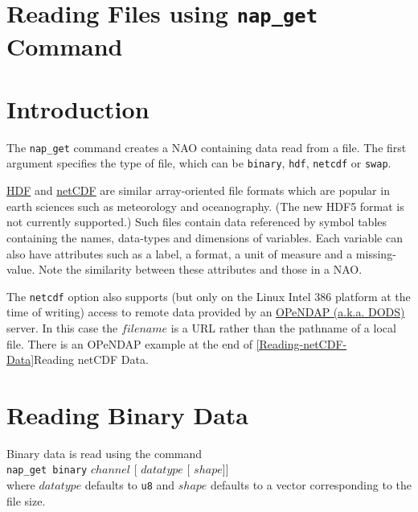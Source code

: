     \section{Reading Files using 
    \texttt{nap\_get} Command}

  \section{
    \label{Introduction}Introduction
  }

  

The 
  \texttt{nap\_get} command creates a NAO containing data read from
  a file. The first argument specifies the type of file, which can be 
  \texttt{binary}, 
  \texttt{hdf}, 
  \texttt{netcdf} or 
  \texttt{swap}.
  


  \href{http://hdf.ncsa.uiuc.edu}{HDF} and 
  \href{http://www.unidata.ucar.edu/packages/netcdf/index.html}{netCDF}
  are similar array-oriented file formats which are popular in earth
  sciences such as meteorology and oceanography. (The new HDF5 format
  is not currently supported.) Such files contain data referenced by
  symbol tables containing the names, data-types and dimensions of
  variables. Each variable can also have attributes such as a label, a
  format, a unit of measure and a missing-value. Note the similarity
  between these attributes and those in a NAO.
  

The 
  \texttt{netcdf} option also supports (but only on the Linux Intel
  386 platform at the time of writing) access to remote data provided
  by an 
  \href{http://www.opendap.org/}{OPeNDAP (a.k.a. DODS)} server.
  In this case the 
  $filename$ is a URL rather than the pathname of a local
  file. There is an OPeNDAP example at the end of 
  \ref{Reading-netCDF-Data}Reading netCDF Data.
  \section{
    \label{Reading-Binary-Data}Reading Binary Data
  }

  

Binary data is read using the command
  \\
  \texttt{nap\_get binary} 
  $channel$ [
  $datatype$ [
  $shape$]]
  \\where 
  $datatype$ defaults to 
  \texttt{u8} and 
  $shape$ defaults to a vector corresponding to the file
  size.
  

